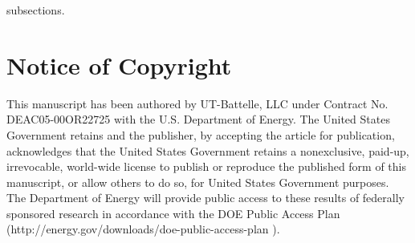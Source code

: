subsections.  \documentclass[conference]{IEEEtran}
\begin{document}
\section{Notice of Copyright}\label{notice-of-copyright}

This manuscript has been authored by UT-Battelle, LLC under Contract No.
DEAC05-00OR22725 with the U.S. Department of Energy. The United States
Government retains and the publisher, by accepting the article for publication,
acknowledges that the United States Government retains a nonexclusive, paid-up,
irrevocable, world-wide license to publish or reproduce the published form of
this manuscript, or allow others to do so, for United States Government
purposes. The Department of Energy will provide public access to these results
of federally sponsored research in accordance with the DOE Public Access Plan
(http://energy.gov/downloads/doe-public-access-plan ).









\end{document}
